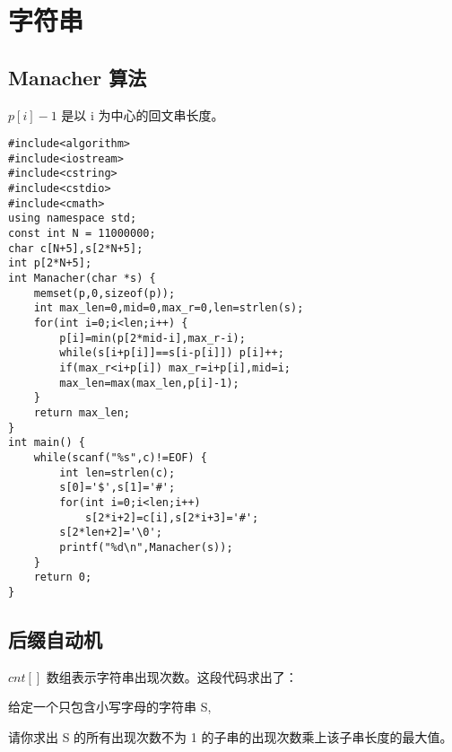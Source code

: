 \documentclass[UTF8]{ctexart}
\begin{document}
\newpage
\section{字符串}
\subsection{Manacher 算法}
$p[i]-1$ 是以 i 为中心的回文串长度。

\begin{framed}
\begin{lstlisting}
#include<algorithm>
#include<iostream>
#include<cstring>
#include<cstdio>
#include<cmath>
using namespace std;
const int N = 11000000;
char c[N+5],s[2*N+5];
int p[2*N+5];
int Manacher(char *s) {
    memset(p,0,sizeof(p));
    int max_len=0,mid=0,max_r=0,len=strlen(s);
    for(int i=0;i<len;i++) {
        p[i]=min(p[2*mid-i],max_r-i);
        while(s[i+p[i]]==s[i-p[i]]) p[i]++;
        if(max_r<i+p[i]) max_r=i+p[i],mid=i;
        max_len=max(max_len,p[i]-1);
    }
    return max_len;
}
int main() {
    while(scanf("%s",c)!=EOF) {
        int len=strlen(c);
        s[0]='$',s[1]='#';
        for(int i=0;i<len;i++)
            s[2*i+2]=c[i],s[2*i+3]='#';
        s[2*len+2]='\0';
        printf("%d\n",Manacher(s));
    }
    return 0;
}
\end{lstlisting}
\end{framed}

\subsection{后缀自动机}
$cnt[]$ 数组表示字符串出现次数。这段代码求出了：

给定一个只包含小写字母的字符串 S,

请你求出 S 的所有出现次数不为 1 的子串的出现次数乘上该子串长度的最大值。
\end{document}
